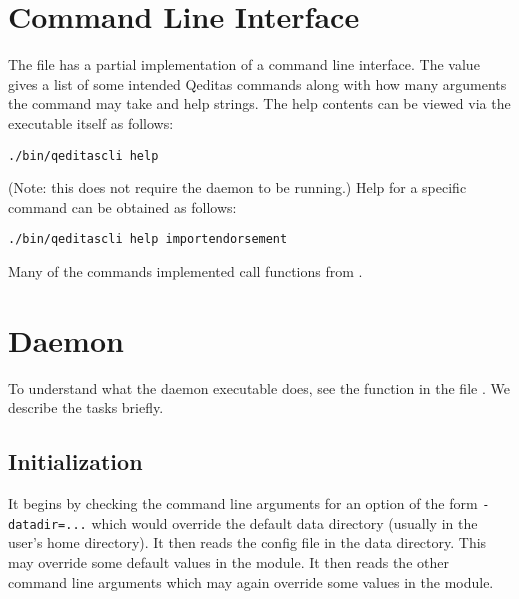 \section{Command Line Interface}

The file {} has a partial implementation of a command line interface.
The value {} gives a list of some intended Qeditas commands
along with how many arguments the command may take and help strings.
The help contents can be viewed via the executable itself as follows:
\begin{verbatim}
./bin/qeditascli help
\end{verbatim}
(Note: this does not require the daemon to be running.)
Help for a specific command can be obtained as follows:
\begin{verbatim}
./bin/qeditascli help importendorsement
\end{verbatim}
Many of the commands implemented call functions from {}.

\section{Daemon}

To understand what the daemon executable {} does,
see the function {} in the file {}.
We describe the tasks {} briefly.

\subsection{Initialization}

It begins by checking the command line arguments for an option
of the form \verb+-datadir=...+
which would override the default data directory (usually {}
in the user's home directory).
It then reads the config file {} in the data directory.
This may override some default values in the {} module.
It then reads the other command line arguments which may again override
some values in the {} module.

